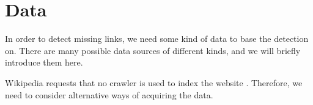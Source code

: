 %
%
%
%
%
%


\section{Data}\label{sec:data}
In order to detect missing links, we need some kind of data to base the detection on. There are many possible data sources of different kinds, and we will briefly introduce them here. 

Wikipedia requests that no crawler is used to index the website . Therefore, we need to consider alternative ways of acquiring the data.


